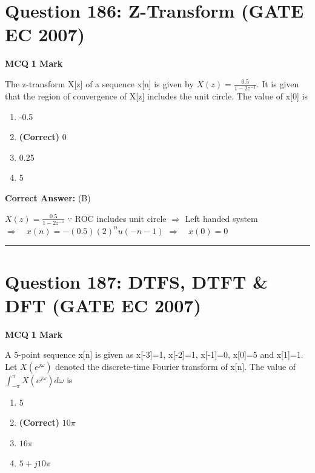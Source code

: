 \documentclass[11pt,a4paper]{article}
\begin{document}
\section*{Question 186: Z-Transform (GATE EC 2007)}
\noindent \textbf{\color{primary}MCQ} \hfill \textbf{\color{secondary}1 Mark}


\noindent The z-transform X[z] of a sequence x[n] is given by $X(z)=\frac{0.5}{1-2z^{-1}}$. It is given that the region of convergence of X[z] includes the unit circle. The value of x[0] is


\begin{enumerate}[label=(\Alph*)]
    \item -0.5
    \item \textbf{(Correct)} 0
    \item 0.25
    \item 5
\end{enumerate}

\noindent \textbf{Correct Answer:} (B)

\begin{tcolorbox}[solbox, title=Detailed Solution -- Question 186]
$X(z)=\frac{0.5}{1-2 z^{-1}}$
$\because$ ROC includes unit circle
$\Rightarrow$ Left handed system 
$\Rightarrow \quad x(n)=-(0.5)(2)^{n} u(-n-1)$
$\Rightarrow \quad x(0)=0$
\end{tcolorbox}

\vspace{1.5em}
\hrule
\vspace{1.5em}

\section*{Question 187: DTFS, DTFT \& DFT (GATE EC 2007)}
\noindent \textbf{\color{primary}MCQ} \hfill \textbf{\color{secondary}1 Mark}


\noindent A 5-point sequence x[n]  is given as 
 x[-3]=1, x[-2]=1,  x[-1]=0, x[0]=5 and x[1]=1. 
Let $X(e^{j\omega })$ denoted the discrete-time Fourier transform of x[n]. The value of $\int_{-\pi }^{\pi }X(e^{j\omega })d\omega$ is


\begin{enumerate}[label=(\Alph*)]
    \item 5
    \item \textbf{(Correct)} $10\pi$
    \item $16\pi$
    \item $5+j10\pi$
\end{enumerate}
\end{document}
